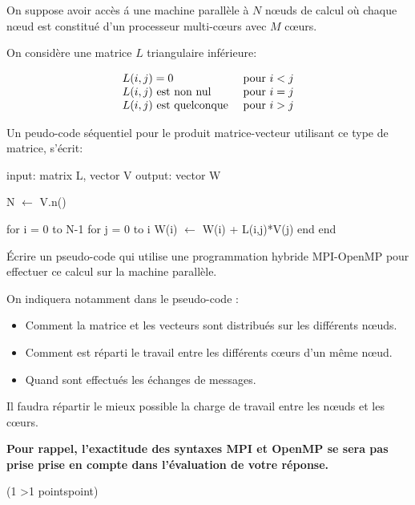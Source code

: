 \documentclass[12pt]{report}
\newcounter{cptPoints}
\newcounter{cptQuestions}
\newcommand\question[2]{\bigskip\par\addtocounter{cptQuestions}{1}\addtocounter{cptPoints}{#2}{\bf Question #1 n\textsuperscript{o} \thecptQuestions} (#2 \ifnum #2>1 points\else point\fi)\par}
\begin{document}
On suppose avoir acc\`es \'a une machine parall\`ele \`a $N$ n\oe uds de calcul o\`u chaque n\oe ud est constitu\'e d'un processeur multi-c\oe urs avec $M$ c\oe urs.
\medskip

On considère une matrice $L$ triangulaire inf\'erieure:

$$
\begin{array}{ll}
L(i,j) = 0 & \hbox{pour } i < j \\
L(i,j) \hbox{ est non nul } & \hbox{pour } i = j \\
L(i,j) \hbox{ est quelconque } & \hbox{pour } i > j \\
\end{array}
$$

Un peudo-code séquentiel pour le produit matrice-vecteur utilisant ce type de matrice, s'écrit:
\begin{center}
\begin{minipage}{10cm}
\begin{algorithm}
input: matrix L, vector V
output: vector W
		
N $\gets$ V.n()
				
for i = 0 to N-1
   for j = 0 to i
      W(i) $\gets$ W(i) + L(i,j)*V(j)
   end
end       
\end{algorithm}
\end{minipage}
\end{center}

\'Ecrire un pseudo-code qui utilise une programmation hybride MPI-OpenMP pour effectuer ce calcul sur la machine parall\`ele. 

On indiquera notamment dans le pseudo-code :
\begin{itemize}
	\item Comment la matrice et les vecteurs sont distribu\'es sur les diff\'erents n\oe uds.
	\item Comment est r\'eparti le travail entre les diff\'erents c\oe urs d'un m\^eme n\oe ud.
	\item Quand sont effectu\'es les \'echanges de messages.
\end{itemize}

Il faudra r\'epartir le mieux possible la charge de travail entre les n\oe uds et les c\oe urs.

\medskip
{\bf Pour rappel, l'exactitude des syntaxes MPI et OpenMP se sera pas prise prise en compte dans l'\'evaluation de votre r\'eponse.}
 
\vfill\eject

\question{}1
\end{document}
